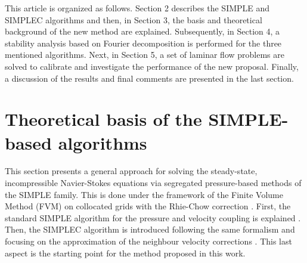 \documentclass[final,3p,times,11pt,onecolumn]{myElsarticle}
\numberwithin{equation}{section}
\begin{document}
This article is organized as follows. Section 2 describes the SIMPLE and SIMPLEC algorithms and then, in Section 3, the basis and theoretical background of the new method are explained. Subsequently, in Section 4, a stability analysis based on Fourier decomposition is performed for the three mentioned algorithms. Next, in Section 5, a set of laminar flow problems are solved to calibrate and investigate the performance of the new proposal. Finally, a discussion of the results and final comments are presented in the last section.

\section{Theoretical basis of the SIMPLE-based algorithms} \label{sec:theory}

This section presents a general approach for solving the steady-state, incompressible Navier-Stokes equations via segregated pressure-based methods of the SIMPLE family. This is done under the framework of the Finite Volume Method (FVM) on collocated grids with the Rhie-Chow correction \cite{rhiechow}. First, the standard SIMPLE algorithm for the pressure and velocity coupling is explained \cite{patankar1972}. Then, the SIMPLEC algorithm is introduced \cite{vanDoormal} following the same formalism and focusing on the approximation of the neighbour velocity corrections \cite{moukalled}. This last aspect is the starting point for the method proposed in this work.
\end{document}
